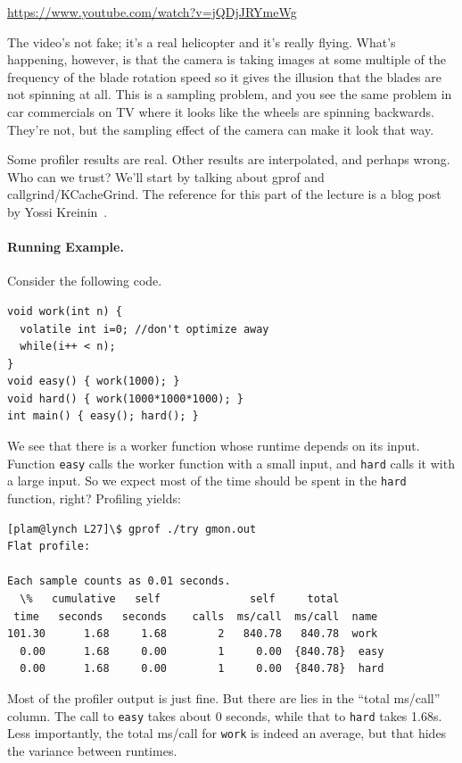 \documentclass[a4paper]{report}
\begin{document}
\begin{center}
	\url{https://www.youtube.com/watch?v=jQDjJRYmeWg}
\end{center}

The video's not fake; it's a real helicopter and it's really flying. What's happening, however, is that the camera is taking images at some multiple of the frequency of the blade rotation speed so it gives the illusion that the blades are not spinning at all. This is a sampling problem, and you see the same problem in car commercials on TV where it looks like the wheels are spinning backwards. They're not, but the sampling effect of the camera can make it look that way.

Some profiler results are real.  Other results are interpolated, and
perhaps wrong. Who can we trust? We'll start by talking about gprof and callgrind/KCacheGrind. The reference for this part of the lecture is a blog post by Yossi Kreinin~\cite{lies}.

\paragraph{Running Example.} Consider the following code.

\begin{lstlisting}
void work(int n) {
  volatile int i=0; //don't optimize away
  while(i++ < n);
}
void easy() { work(1000); }
void hard() { work(1000*1000*1000); }
int main() { easy(); hard(); }
\end{lstlisting}

We see that there is a worker function whose runtime depends on its input.
Function {\tt easy} calls the worker function with a small input, and {\tt hard} calls
it with a large input. So we expect most of the time should be spent in the \texttt{hard} function, right? 
Profiling yields:
\begin{verbatim}
[plam@lynch L27]\$ gprof ./try gmon.out
Flat profile:

Each sample counts as 0.01 seconds.
  \%   cumulative   self              self     total           
 time   seconds   seconds    calls  ms/call  ms/call  name    
101.30      1.68     1.68        2   840.78   840.78  work
  0.00      1.68     0.00        1     0.00  {840.78}  easy
  0.00      1.68     0.00        1     0.00  {840.78}  hard
\end{verbatim}
Most of the profiler output is just fine. But there are lies in the
``total ms/call'' column. The call to {\tt easy} takes about 0 seconds,
while that to {\tt hard} takes 1.68s. Less importantly, the total ms/call for
{\tt work} is indeed an average, but that hides the variance between runtimes.
\end{document}
